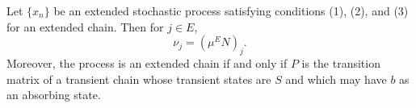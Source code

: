 Let $\{x_n\}$ be an extended stochastic process satisfying conditions (1), (2), and (3) for an extended chain. Then for $j \in E$,
$$\nu_j = (\mu^E N)_j.$$
Moreover, the process is an extended chain if and only if $P$ is the transition matrix of a transient chain whose transient states are $S$ and which may have $b$ as an absorbing state.
